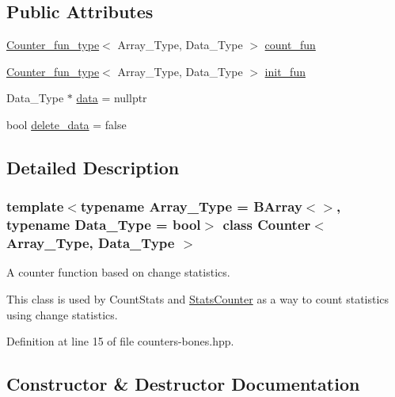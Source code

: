 \subsection*{Public Attributes}
\begin{DoxyCompactItemize}
\item 
\hyperlink{typedefs_8hpp_ac0160f52f564dea3ac033b374cffbfe7}{Counter\+\_\+fun\+\_\+type}$<$ Array\+\_\+\+Type, Data\+\_\+\+Type $>$ \hyperlink{class_counter_a804d287379ef9b4204a0838edcce3b71}{count\+\_\+fun}
\item 
\hyperlink{typedefs_8hpp_ac0160f52f564dea3ac033b374cffbfe7}{Counter\+\_\+fun\+\_\+type}$<$ Array\+\_\+\+Type, Data\+\_\+\+Type $>$ \hyperlink{class_counter_abb4e0b67e6489d438918495651baa5a8}{init\+\_\+fun}
\item 
Data\+\_\+\+Type $\ast$ \hyperlink{class_counter_a9ebfed99a67888f80c19cabc4098bdd0}{data} = nullptr
\item 
bool \hyperlink{class_counter_a5190fbe81aac2426ac36c0a088e242e7}{delete\+\_\+data} = false
\end{DoxyCompactItemize}


\subsection{Detailed Description}
\subsubsection*{template$<$typename Array\+\_\+\+Type = B\+Array$<$$>$, typename Data\+\_\+\+Type = bool$>$\newline
class Counter$<$ Array\+\_\+\+Type, Data\+\_\+\+Type $>$}

A counter function based on change statistics. 

This class is used by {\ttfamily Count\+Stats} and {\ttfamily \hyperlink{class_stats_counter}{Stats\+Counter}} as a way to count statistics using change statistics. 

Definition at line 15 of file counters-\/bones.\+hpp.



\subsection{Constructor \& Destructor Documentation}
\mbox{\label{class_counter_a56c2f4ad875497dea97934cd3ddebc81}} 
